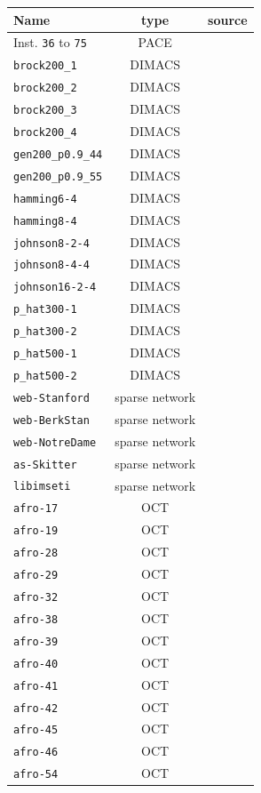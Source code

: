 \documentclass[12pt,a4paper,twoside]{scrartcl}
\numberwithin{equation}{section}
\begin{document}
\begin{table}[hbt!]
	\centering
	\begin{tabular}{l|c|r}
		Name & type & source \\ \hline
		Inst. \texttt{36} to \texttt{75} & PACE & \cite{PACE_INST, pace} \\ \hline
		\texttt{brock200\_1} & DIMACS & \cite{DIMACS} \\
		\texttt{brock200\_2} & DIMACS & \cite{DIMACS} \\
		\texttt{brock200\_3} & DIMACS & \cite{DIMACS} \\
		\texttt{brock200\_4} & DIMACS & \cite{DIMACS} \\
		\texttt{gen200\_p0.9\_44} & DIMACS & \cite{DIMACS} \\
		\texttt{gen200\_p0.9\_55} & DIMACS & \cite{DIMACS} \\
		\texttt{hamming6-4} & DIMACS & \cite{DIMACS} \\
		\texttt{hamming8-4} & DIMACS & \cite{DIMACS} \\
		\texttt{johnson8-2-4} & DIMACS & \cite{DIMACS} \\
		\texttt{johnson8-4-4} & DIMACS & \cite{DIMACS} \\
		\texttt{johnson16-2-4} & DIMACS & \cite{DIMACS} \\
		\texttt{p\_hat300-1} & DIMACS & \cite{DIMACS} \\
		\texttt{p\_hat300-2} & DIMACS & \cite{DIMACS} \\
		\texttt{p\_hat500-1} & DIMACS & \cite{DIMACS} \\
		\texttt{p\_hat500-2} & DIMACS & \cite{DIMACS} \\ \hline	
		\texttt{web-Stanford} & sparse network & \cite{WEB_INST} \\
		\texttt{web-BerkStan} & sparse network & \cite{WEB_INST} \\
		\texttt{web-NotreDame} & sparse network & \cite{WEB_INST2} \\
		\texttt{as-Skitter} & sparse network & \cite{WEB_INST3} \\
		\texttt{libimseti} & sparse network & \cite{WEB_INST4} \\ \hline	
		\texttt{afro-17} & OCT & \cite{OCT}	\\			
		\texttt{afro-19} & OCT & \cite{OCT}	\\			
		\texttt{afro-28} & OCT & \cite{OCT}	\\			
		\texttt{afro-29} & OCT & \cite{OCT}	\\				
		\texttt{afro-32} & OCT & \cite{OCT}	\\			
		\texttt{afro-38} & OCT & \cite{OCT}	\\			
		\texttt{afro-39} & OCT & \cite{OCT}	\\		
		\texttt{afro-40} & OCT & \cite{OCT}	\\			
		\texttt{afro-41} & OCT & \cite{OCT}	\\			
		\texttt{afro-42} & OCT & \cite{OCT}	\\				
		\texttt{afro-45} & OCT & \cite{OCT}	\\			
		\texttt{afro-46} & OCT & \cite{OCT}	\\			
		\texttt{afro-54} & OCT & \cite{OCT}	\\
		

\end{tabular}
\end{table}
\end{document}
